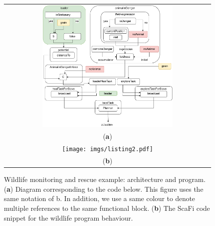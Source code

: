\documentclass[jsan,article,accept,moreauthors,pdftex]{Definitions/mdpi}
\begin{document}
\nointerlineskip
\begin{figure}[H]
\widefigure
\begin{tabular}{c}
\includegraphics[width=0.65\textwidth]{imgs/wildlife-program-diagram.pdf}\\
({\bf a})\\
\texttt{[image: imgs/listing2.pdf]}\\
({\bf b})\\
\end{tabular}
\caption{Wildlife monitoring and rescue example: architecture and program. (\textbf{a}) Diagram corresponding to the code below. This figure uses the same notation of b. In addition, we use a same colour to denote multiple references to the same functional block. (\textbf{b}) The ScaFi code snippet for the wildlife program behaviour.}
\label{fig:wildlife-example}
\end{figure}
\end{document}
